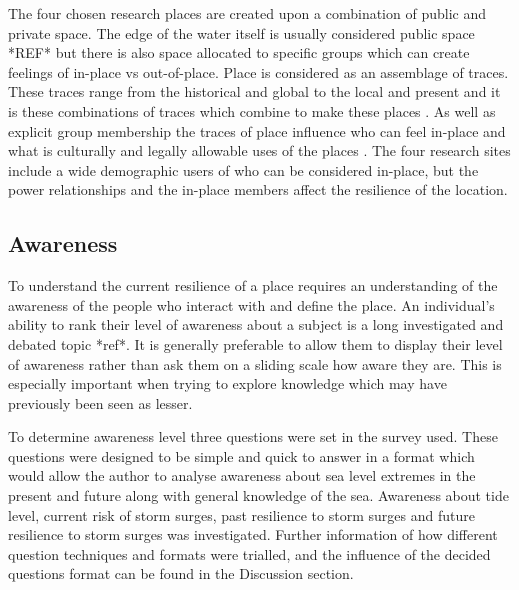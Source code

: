 \documentclass{article}
\begin{document}
The four chosen research places are created upon a combination of public and private space. The edge of the water itself is usually considered public space *REF* but there is also space allocated to specific groups which can create feelings of in-place vs out-of-place. Place is considered as an assemblage of traces. These traces range from the historical and global to the local and present and it is these combinations of traces which combine to make these places \cite{anderson_understanding_2015} \cite{massey_for_2005}. As well as explicit group membership the traces of place influence who can feel in-place and what is culturally and legally allowable uses of the places \cite{anderson_understanding_2015}. The four research sites include a wide demographic users of who can be considered in-place, but the power relationships and the in-place members affect the resilience of the location. 

\subsection{Awareness}
To understand the current resilience of a place requires an understanding of the awareness of the people who interact with and define the place. An individual’s ability to rank their level of awareness about a subject is a long investigated and debated topic *ref*. It is generally preferable to allow them to display their level of awareness rather than ask them on a sliding scale how aware they are. This is especially important when trying to explore knowledge which may have previously been seen as lesser.

To determine awareness level three questions were set in the survey used. These questions were designed to be simple and quick to answer in a format which would allow the author to analyse awareness about sea level extremes in the present and future along with general knowledge of the sea. Awareness about tide level, current risk of storm surges, past resilience to storm surges and future resilience to storm surges was investigated. Further information of how different question techniques and formats were trialled, and the influence of the decided questions format can be found in the Discussion section.
\end{document}
